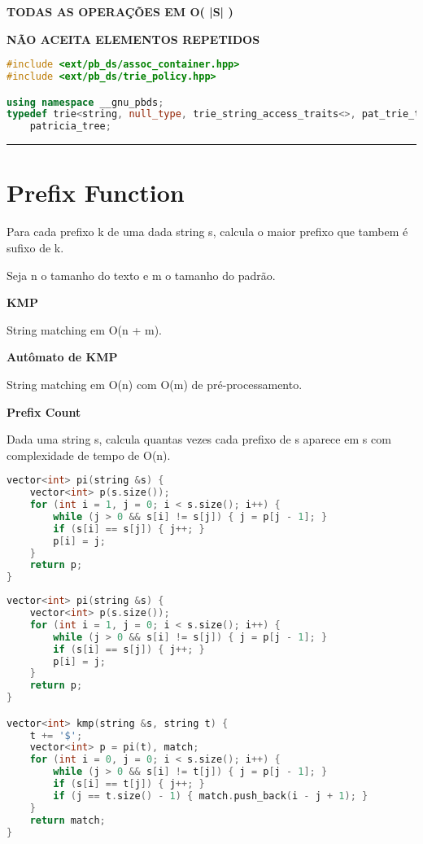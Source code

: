 \documentclass[11pt, a4paper, twoside]{book}
\begin{document}
\textbf{TODAS AS OPERAÇÕES EM O( |S| )}  

\textbf{NÃO ACEITA ELEMENTOS REPETIDOS}


\hfill

\begin{lstlisting}[language=C++]
#include <ext/pb_ds/assoc_container.hpp>
#include <ext/pb_ds/trie_policy.hpp>

using namespace __gnu_pbds;
typedef trie<string, null_type, trie_string_access_traits<>, pat_trie_tag, trie_prefix_search_node_update>
    patricia_tree;
\end{lstlisting}

\hfill

\rule{\textwidth}{0.4pt}

\section{Prefix Function}



Para cada prefixo k de uma dada string s, calcula o maior prefixo que tambem é sufixo de k.



Seja n o tamanho do texto e m o tamanho do padrão.



\textbf{KMP} 



String matching em O(n + m).



\textbf{Autômato de KMP} 



String matching em O(n) com O(m) de pré-processamento.



\textbf{Prefix Count} 



Dada uma string s, calcula quantas vezes cada prefixo de s aparece em s com complexidade de tempo de O(n).


\hfill

\begin{lstlisting}[language=C++]
vector<int> pi(string &s) {
    vector<int> p(s.size());
    for (int i = 1, j = 0; i < s.size(); i++) {
        while (j > 0 && s[i] != s[j]) { j = p[j - 1]; }
        if (s[i] == s[j]) { j++; }
        p[i] = j;
    }
    return p;
}
\end{lstlisting}

\hfill

\begin{lstlisting}[language=C++]
vector<int> pi(string &s) {
    vector<int> p(s.size());
    for (int i = 1, j = 0; i < s.size(); i++) {
        while (j > 0 && s[i] != s[j]) { j = p[j - 1]; }
        if (s[i] == s[j]) { j++; }
        p[i] = j;
    }
    return p;
}

vector<int> kmp(string &s, string t) {
    t += '$';
    vector<int> p = pi(t), match;
    for (int i = 0, j = 0; i < s.size(); i++) {
        while (j > 0 && s[i] != t[j]) { j = p[j - 1]; }
        if (s[i] == t[j]) { j++; }
        if (j == t.size() - 1) { match.push_back(i - j + 1); }
    }
    return match;
}
\end{lstlisting}
\end{document}
